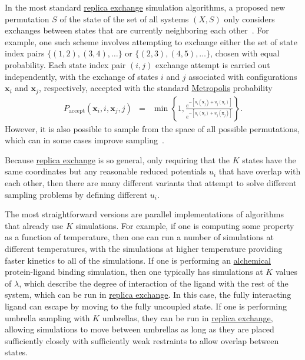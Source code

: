 \documentclass[9pt,review]{livecoms}
\newcommand{\vx}{\mathbf{x}}
\begin{document}
In the most standard \hyperlink{ref:ReplEx} {replica exchange} simulation algorithms, a proposed new permutation $S$ of the state of the set of all systems $(X,S)$  only considers exchanges between states that are currently neighboring each other~\cite{hukushima-nemoto:j-phys-soc-jpn:1996:parallel-tempering,hansmann:chem-phys-lett:1997:parallel-tempering-monte-carlo,sugita-okamoto:chem-phys-lett:1999:parallel-tempering-md,sugita-kitao-okamoto:jcp:2000:hamiltonian-exchange,fukunishi-watanabe-takada:jcp:2002:hamiltonian-exchange,jang-shin-pak:prl:2003:hamiltonian-exchange,kwak-hansmann:prl:2005:hamiltonian-exchange}.
For example, one such scheme involves attempting to exchange either the set of state index pairs $\{(1,2), (3,4), \ldots\}$ or $\{(2,3), (4,5), \ldots\}$, chosen with equal probability. Each state index pair $(i,j)$ exchange attempt is carried out independently, with the exchange of states $i$ and $j$ associated with configurations $\vx_i$ and $\vx_j$, respectively, accepted with the standard \hyperlink{ref:MetropolisMonteCarlo} {Metropolis} probability
\begin{eqnarray}
\label{eq:re_exchange_prob}
P_\mathrm{accept}(\vx_i, i, \vx_j, j) &=& \min\left\{ 1, \frac{e^{-[u_i(\vx_j)+u_j(\vx_i)]}}{e^{-[u_i(\vx_i) + u_j(\vx_j)]}}\right\}.
\label{eq:metropolis-replica}
\end{eqnarray}
However, it is also possible to sample from the space of all possible permutations, which can in some cases improve sampling~\cite{shirts_gibbssamp}.

Because \hyperlink{ref:ReplEx} {replica exchange} is so general, only requiring that the $K$ states have the same coordinates but any reasonable reduced potentials $u_i$ that have overlap with each other, then there are many different variants that attempt to solve different sampling problems by defining different $u_i$.

The most straightforward versions are parallel implementations of algorithms that already use $K$ simulations. For example, if one is computing some property as a function of temperature, then one can run a number of simulations at different temperatures, with the simulations at higher temperature providing faster kinetics to all of the simulations. If one is performing an \hyperlink{ref:Alchemical} {alchemical} protein-ligand binding simulation, then one typically has simulations at $K$ values of $\lambda$, which describe the degree of interaction of the ligand with the rest of the system, which can be run in \hyperlink{ref:ReplEx} {replica exchange}. In this case, the fully interacting ligand can escape by moving to the fully uncoupled state. If one is performing umbrella sampling with $K$ umbrellas, they can be run in \hyperlink{ref:ReplEx} {replica exchange}, allowing simulations to move between umbrellas as long as they are placed sufficiently closely with sufficiently weak restraints to allow overlap between states.
\end{document}
